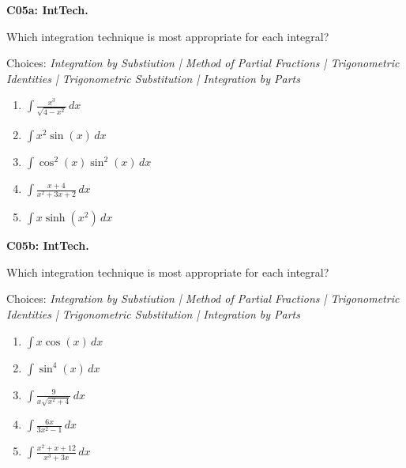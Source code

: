 \documentclass[12pt]{article}
\newcommand{\<}{\left\langle}
\renewcommand{\>}{\right\rangle}
\newcommand{\exerciseHeader}[4]{


  \vspace{0.5em}
  \textbf{#2}
  \vspace{0.5em}

}
\begin{document}
\begin{multicols}{2}
\exerciseHeader{2017 June 21}{C05a: IntTech.}{
Identify appropriate integration techniques.
}{4/4}

Which integration technique is most appropriate for each integral?

Choices: \textit{Integration by Substiution
| Method of Partial Fractions
| Trigonometric Identities
| Trigonometric Substitution
| Integration by Parts}

  \begin{enumerate}
    \item \(\int\frac{x^3}{\sqrt{4-x^2}}\,dx\)
    \item \(\int x^2\sin(x)\,dx\)
    \item \(\int\cos^2(x)\sin^2(x)\,dx\)
    \item \(\int\frac{x+4}{x^2+3x+2}\,dx\)
    \item \(\int x\sinh(x^2)\,dx\)
  \end{enumerate}

\exerciseHeader{2017 June 21}{C05b: IntTech.}{
Identify appropriate integration techniques.
}{4/4}

Which integration technique is most appropriate for each integral?

Choices: \textit{Integration by Substiution
| Method of Partial Fractions
| Trigonometric Identities
| Trigonometric Substitution
| Integration by Parts}

  \begin{enumerate}
    \item \(\displaystyle\int x\cos(x)\,dx\)
    \item \(\displaystyle\int \sin^4(x)\,dx\)
    \item \(\displaystyle\int\frac{9}{x\sqrt{x^2+4}}\,dx\)
    \item \(\displaystyle\int\frac{6x}{3x^2-1}\,dx\)
    \item \(\displaystyle\int\frac{x^2+x+12}{x^3+3x}\,dx\)
  \end{enumerate}



%

%


\end{multicols}
\end{document}
